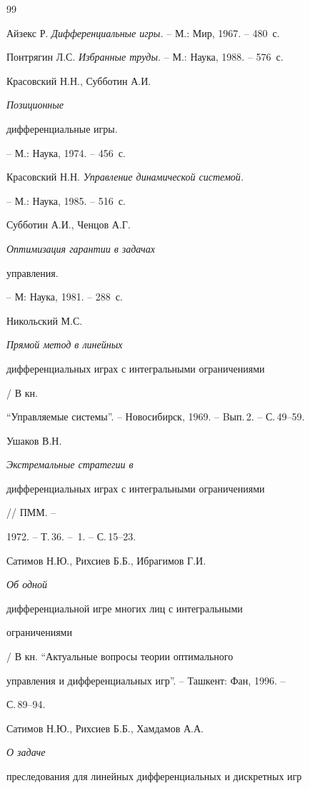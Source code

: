 \begin{thebibliography}{99}







Айзекс Р. {\em Дифференциальные игры.} -- М.: Мир, 1967. -- 480~с.




Понтрягин Л.С. { \em Избранные труды.} -- М.: Наука, 1988. -- 576~с.




Красовский Н.Н., Субботин А.И. { \em Позиционные


дифференциальные игры.} -- М.: Наука, 1974. -- 456~с.




Красовский Н.Н. { \em Управление динамической системой.}


-- М.: Наука, 1985. -- 516~с.




Субботин А.И., Ченцов А.Г. { \em Оптимизация гарантии в задачах


управления.} -- М: Наука, 1981. -- 288~с.




Никольский М.С. { \em Прямой метод в линейных


дифференциальных играх с интегральными ограничениями} / В кн.


``Управляемые системы''. -- Новосибирск, 1969. -- Bып.\,2. -- С.\,49--59.




Ушаков В.Н. { \em Экстремальные стратегии в


дифференциальных играх с интегральными ограничениями} // ПММ. --


1972. -- Т.\,36. -- \No\,1. -- С.\,15--23.




Сатимов Н.Ю., Рихсиев Б.Б., Ибрагимов Г.И. { \em Об одной


дифференциальной игре многих лиц с интегральными


ограничениями} / В кн. ``Актуальные вопросы теории оптимального


управления и дифференциальных игр''. -- Ташкент: Фан, 1996. --


С.\,89--94.




Сатимов Н.Ю., Рихсиев Б.Б., Хамдамов А.А. { \em О задаче


преследования для линейных дифференциальных и дискретных игр


}
\end{thebibliography}
